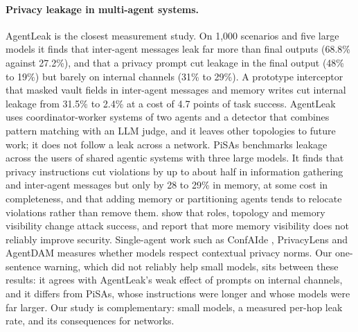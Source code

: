\documentclass[preprint,12pt,authoryear]{elsarticle}
\begin{document}
\paragraph{Privacy leakage in multi-agent systems.}
AgentLeak \citep{elyagoubi2026} is the closest measurement study. On 1,000 scenarios and five large models it finds that inter-agent messages leak far more than final outputs (68.8\% against 27.2\%), and that a privacy prompt cut leakage in the final output (48\% to 19\%) but barely on internal channels (31\% to 29\%). A prototype interceptor that masked vault fields in inter-agent messages and memory writes cut internal leakage from 31.5\% to 2.4\% at a cost of 4.7 points of task success. AgentLeak uses coordinator-worker systems of two agents and a detector that combines pattern matching with an LLM judge, and it leaves other topologies to future work; it does not follow a leak across a network. PiSAs \citep{gupta2026} benchmarks leakage across the users of shared agentic systems with three large models. It finds that privacy instructions cut violations by up to about half in information gathering and inter-agent messages but only by 28 to 29\% in memory, at some cost in completeness, and that adding memory or partitioning agents tends to relocate violations rather than remove them. \citet{hagag2026} show that roles, topology and memory visibility change attack success, and report that more memory visibility does not reliably improve security. Single-agent work such as ConfAIde \citep{mireshghallah}, PrivacyLens \citep{shao2024} and AgentDAM \citep{zharmagambetov2025} measures whether models respect contextual privacy norms. Our one-sentence warning, which did not reliably help small models, sits between these results: it agrees with AgentLeak's weak effect of prompts on internal channels, and it differs from PiSAs, whose instructions were longer and whose models were far larger. Our study is complementary: small models, a measured per-hop leak rate, and its consequences for networks.
\end{document}
